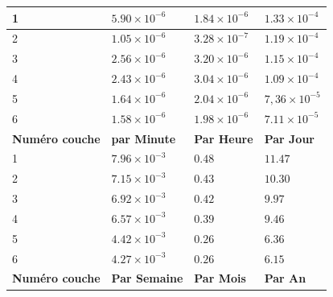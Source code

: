 \begin{table}[h]
\begin{tabular}{|l|l|l|l|}
1                                   & $5.90 \times 10^{-6}$                & $1.84 \times 10^{-6}$               & $1.33 \times 10^{-4}$             \\ \hline
2                                   & $1.05 \times 10^{-6}$                & $3.28 \times 10^{-7}$               & $1.19 \times 10^{-4}$             \\ \hline
3                                   & $2.56 \times 10^{-6}$                & $3.20 \times 10^{-6}$               & $1.15 \times 10^{-4}$             \\ \hline
4                                   & $2.43 \times 10^{-6}$                & $3.04 \times 10^{-6}$               & $1.09 \times 10^{-4}$             \\ \hline
5                                   & $1.64 \times 10^{-6}$                & $2.04 \times 10^{-6}$               & $7,36 \times 10^{-5}$    \\ \hline
6                                   & $1.58 \times 10^{-6}$                & $1.98 \times 10^{-6}$               & $7.11 \times 10^{-5}$     \\ \hline
\textbf{Num\'ero couche}              & \textbf{par Minute}                  & \textbf{Par Heure}                  & \textbf{Par Jour}        \\ \hline
1                                   & $7.96 \times 10^{-3}$                         & $0.48$                               & $11.47$            \\ \hline
2                                   & $7.15 \times 10^{-3}$                         & $0.43$                               & $10.30$            \\ \hline
3                                   & $6.92 \times 10^{-3}$                         & $0.42$                               & $9.97$             \\ \hline
4                                   & $6.57 \times 10^{-3}$                         & $0.39$                               & $9.46$             \\ \hline
5                                   & $4.42 \times 10^{-3}$                         & $0.26$                               & $6.36$             \\ \hline
6                                   & $4.27 \times 10^{-3}$                         & $0.26$                               & $6.15$             \\ \hline
\textbf{Num\'ero couche}              & \textbf{Par Semaine}                 & \textbf{Par Mois}                   & \textbf{Par An}          \\ \hline

\end{tabular}
\end{table}
